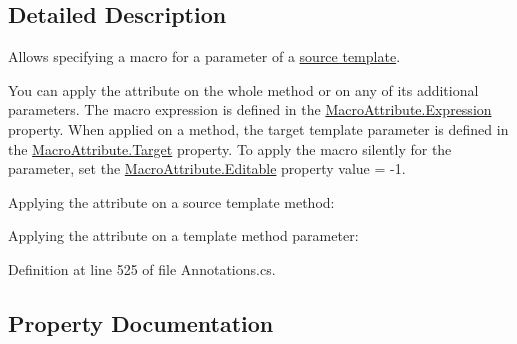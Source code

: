 \subsection{Detailed Description}
Allows specifying a macro for a parameter of a \hyperlink{class_source_template_attribute}{source template}. 

You can apply the attribute on the whole method or on any of its additional parameters. The macro expression is defined in the \hyperlink{class_macro_attribute_a172bf7385bb748baa1eb2fa931f1f9f8}{Macro\+Attribute.\+Expression} property. When applied on a method, the target template parameter is defined in the \hyperlink{class_macro_attribute_a94502148414b928f01ad540a924846d0}{Macro\+Attribute.\+Target} property. To apply the macro silently for the parameter, set the \hyperlink{class_macro_attribute_a273bac2efafc085eba59752b2ea3ae58}{Macro\+Attribute.\+Editable} property value = -\/1. 

Applying the attribute on a source template method\+: 
 Applying the attribute on a template method parameter\+: 
 

Definition at line 525 of file Annotations.\+cs.



\subsection{Property Documentation}
\hypertarget{class_macro_attribute_a273bac2efafc085eba59752b2ea3ae58}{}
